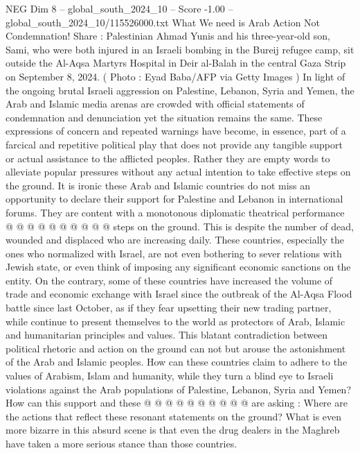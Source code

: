 \begin{textsample}{NEG Dim 8 – global\_south\_2024\_10 – Score -1.00 – global\_south\_2024\_10/115526000.txt}  \label{ex:f8_neg_197}
What We need is Arab Action Not Condemnation!
Share : Palestinian Ahmad Yunis and his three-year-old son, Sami, who were both injured in an Israeli bombing in the Bureij refugee camp, sit outside the Al-Aqsa Martyrs Hospital in Deir al-Balah in the central Gaza Strip on September 8, 2024. ( Photo : Eyad Baba/AFP via Getty Images ) In light of the ongoing brutal Israeli aggression on Palestine, Lebanon, Syria and Yemen, the Arab and Islamic media arenas are crowded with official statements of condemnation and denunciation yet the situation remains the same.
These expressions of concern and repeated warnings have become, in essence, part of a farcical and repetitive political play that does not provide any tangible support or actual assistance to the afflicted peoples.
Rather they are empty words to alleviate popular pressures without any actual intention to take effective steps on the ground.
It is ironic these Arab and Islamic countries do not miss an opportunity to declare their support for Palestine and Lebanon in international forums.
They are content with a monotonous diplomatic theatrical performance @ @ @ @ @ @ @ @ @ @ steps on the ground.
This is despite the number of dead, wounded and displaced who are increasing daily.
These countries, especially the ones who normalized with Israel, are not even bothering to sever relations with Jewish state, or even think of imposing any significant economic sanctions on the entity.
On the contrary, some of these countries have increased the volume of trade and economic exchange with Israel since the outbreak of the Al-Aqsa Flood battle since last October, as if they fear upsetting their new trading partner, while continue to present themselves to the world as protectors of Arab, Islamic and humanitarian principles and values.
This blatant contradiction between political rhetoric and action on the ground can not but arouse the astonishment of the Arab and Islamic peoples.
How can these countries claim to adhere to the values of Arabism, Islam and humanity, while they turn a blind eye to Israeli violations against the Arab populations of Palestine, Lebanon, Syria and Yemen?
How can this support and these @ @ @ @ @ @ @ @ @ @ are asking : Where are the actions that reflect these resonant statements on the ground?
What is even more bizarre in this absurd scene is that even the drug dealers in the Maghreb have taken a more serious stance than those countries.

\end{textsample}
